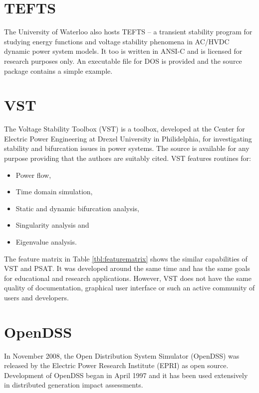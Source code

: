 \section{TEFTS}
The University of Waterloo also hosts TEFTS -- a transient stability program
for studying energy functions and voltage stability phenomena in AC/HVDC
dynamic power system models.  It too is written in ANSI-C and is licensed for
research purposes only.  An executable file for DOS is provided and the source
package contains a simple example.

\section{VST}
The Voltage Stability Toolbox (VST) is a \matlab toolbox, developed at the
Center for Electric Power Engineering at Drexel University in Philidelphia, for
investigating stability and bifurcation issues in power systems.  The source
is available for any purpose providing that the authors are suitably cited.
VST features routines for:
\begin{itemize}
  \item Power flow,
  \item Time domain simulation,
  \item Static and dynamic bifurcation analysis,
  \item Singularity analysis and
  \item Eigenvalue analysis.
\end{itemize}
The feature matrix in Table \ref{tbl:featurematrix} shows the similar
capabilities of VST and PSAT. It was developed around the same time and has
the same goals for educational and research applications.  However, VST does
not have the same quality of documentation, graphical user interface or such an
active community of users and developers.

\section{OpenDSS}
In November 2008, the Open Distribution System Simulator (OpenDSS) was released
by the Electric Power Research Institute (EPRI) as open source.  Development of
OpenDSS began in April 1997 and it has been used extensively in distributed
generation impact assessments.

